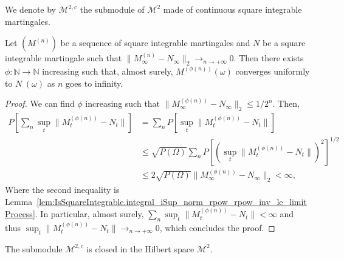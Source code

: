 \begin{definition}\label{def:continuousSquareIntegrable}
  \leanok
We denote by $\mathcal{M}^{2,c}$ the submodule of $\mathcal{M}^2$ made of continuous square integrable martingales.
\end{definition}


\begin{lemma}\label{lem:exists_subsequence_ae_tendsto_uniformly}
  \leanok
Let $(M^{(n)})$ be a sequence of square integrable martingales and $N$ be a square integrable martingale such that $\|M^{(n)}_\infty - N_\infty\|_2 \longrightarrow_{n \to +\infty} 0$. Then there exists $\phi : \mathbb{N} \to \mathbb{N}$ increasing such that, almost surely, $M^{(\phi(n))}_\cdot(\omega)$ converges uniformly to $N_\cdot(\omega)$ as $n$ goes to infinity.
\end{lemma}

\begin{proof}
  \leanok
We can find $\phi$ increasing such that $\|M^{(\phi(n))}_\infty - N_\infty\|_2 \le 1/2^n$. Then,
\begin{align*}
  P[\sum_n \sup_t \|M^{(\phi(n))}_t -  N_t\|] & = \sum_n P[\sup_t \|M^{(\phi(n))}_t -  N_t\|] \\
  & \le \sqrt{P(\Omega)} \sum_n P[(\sup_t \|M^{(\phi(n))}_t -  N_t\|)^2]^{1/2} \\
  & \le 2 \sqrt{P(\Omega)} \|M^{(\phi(n))}_\infty - N_\infty\|_2 < \infty,
\end{align*}
Where the second inequality is Lemma~\ref{lem:IsSquareIntegrable.integral_iSup_norm_rpow_rpow_inv_le_limitProcess}. In particular, almost surely, $\sum_n \sup_t \|M^{(\phi(n))}_t -  N_t\| < \infty$ and thus $\sup_t \|M^{(\phi(n))}_t -  N_t\| \longrightarrow_{n \to +\infty} 0$, which concludes the proof.
\end{proof}


\begin{lemma}\label{lem:isClosed_continuousSquareIntegrable}
  \leanok
The submodule $\mathcal{M}^{2,c}$ is closed in the Hilbert space $\mathcal{M}^2$.
\end{lemma}

